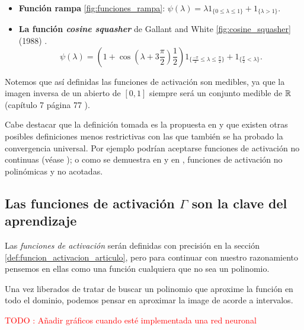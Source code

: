 \begin{definicion}
\begin{itemize}
        \item \textbf{Función rampa} \ref{fig:funciones_rampa}: $\psi(\lambda)  = \lambda 1_{\{0 \leq \lambda \leq  1\}} + 1_{\{\lambda > 1\}}.$
    
        \item \textbf{La función \textit{cosine squasher}} de Gallant and White 
        \ref{fig:cosine_squasher} (1988) \cite{Gallant88thereexists}. 
        \begin{equation*}
    \psi(\lambda )= \left(1 + \cos\left(\lambda + 3 \frac{\pi}{2} \right) \frac{1}{2}\right) 
     1_{\{\frac{-\pi}{2} \leq \lambda \leq  \frac{\pi}{2}\}}
     +
     1_{\{ \frac{\pi}{2} < \lambda \}}.
    \end{equation*}
    \end{itemize}

   Notemos que así definidas las funciones de activación son medibles, ya que la imagen inversa de un abierto de $[0,1]$ siempre será un conjunto medible de  $\mathbb{R}$  (capítulo 7  página 77 \cite{nla.cat-vn1819421}).
    

    Cabe destacar que la definición tomada es la propuesta en \cite{HORNIK1989359} y que existen
    otras posibles definiciones menos restrictivas con las que también se ha probado la convergencia universal.
    Por ejemplo podrían aceptarse funciones de activación no continuas (véase \cite{FUNAHASHI1989183}); 
    o como 
    se demuestra en \cite{DBLP:journals/corr/SonodaM15} y en \cite{non-polynomial-activation-functions}, funciones de activación no polinómicas y no acotadas. 
\end{definicion}

\subsection*{Las funciones de activación $\Gamma$ son la clave del aprendizaje} 

\label{ch03:funcionamiento-intuitivo-funcion-activacion}

Las \textit{funciones de activación} serán definidas con precisión en la sección 
\ref{def:funcion_activacion_articulo}, pero para continuar con nuestro razonamiento 
pensemos en ellas como una función cualquiera que no sea un polinomio. 

Una vez liberados de tratar de buscar un polinomio que aproxime la función en todo
el dominio, podemos pensar en aproximar la image de acorde a intervalos.  
 
\textcolor{red}{TODO : Añadir gráficos cuando esté implementada una red neuronal}

